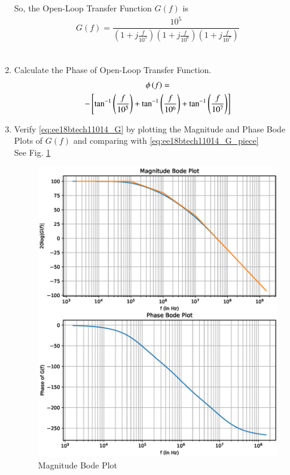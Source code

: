 \begin{enumerate}[label=\thesection.\arabic*.,ref=\thesection.\theenumi]
So, the Open-Loop Transfer Function $G(f)$ is
\begin{align}
\label{eq:ee18btech11014_G}
	G(f) = \dfrac{10^{5}}{\left(1+j\frac{f}{10^{5}}\right)\left(1+j\frac{f}{10^{6}}\right)\left(1+j\frac{f}{10^{7}}\right)}
\end{align}\\
\item Calculate the Phase of Open-Loop Transfer Function.\\
\solution
%
\begin{multline}
\label{eq:ee18btech11014_G_ang}
\phi\left(f\right) =
\\
-{}\left[\tan ^{-1}\left(\frac{f}{10^{5}}\right)+\tan ^{-1}\left(\frac{f}{10^{6}}\right)+\tan ^{-1}\left(\frac{f}{10^{7}}\right)\right]
\end{multline}

\item Verify  \eqref{eq:ee18btech11014_G} by plotting the 
Magnitude and Phase Bode Plots of $G(f)$ and comparing with \eqref{eq:ee18btech11014_G_piece}
\\
\solution
See Fig.  \ref{fig:ee18btech11014_Bode Plot}
\begin{figure}[ht!]
	\begin{center}
		\includegraphics[width=\columnwidth]{./figs/ee18btech11014/Bode_Plot.eps}
	\end{center}
	\caption{Magnitude Bode Plot}
	\label{fig:ee18btech11014_Bode Plot}
\end{figure}


\end{enumerate}
